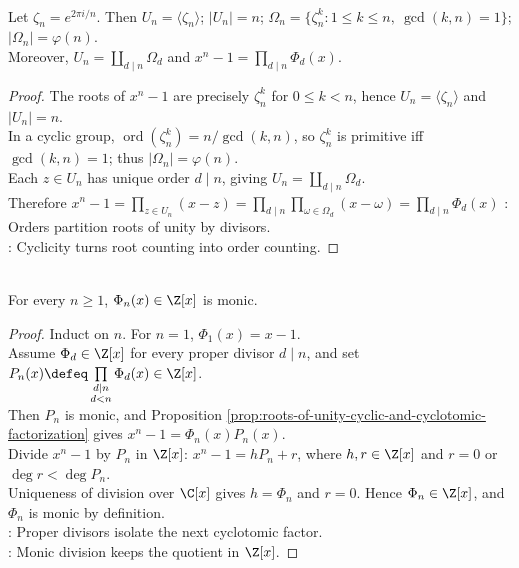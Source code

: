 \begin{proposition} \label{prop:roots-of-unity-cyclic-and-cyclotomic-factorization} \\
Let $\zeta_n=e^{2\pi i/n}$. Then $U_n=\langle\zeta_n\rangle$; $|U_n|=n$; $\Omega_n=\{\zeta_n^k:1\leq k\leq n,\ \gcd(k,n)=1\}$; $|\Omega_n|=\varphi(n)$.\\
Moreover, $U_n=\coprod\limits_{d\mid n}\Omega_d$ and $x^n-1=\prod\limits_{d\mid n}\Phi_d(x)$.
\begin{proof}
The roots of $x^n-1$ are precisely $\zeta_n^k$ for $0\leq k<n$, hence $U_n=\langle\zeta_n\rangle$ and $|U_n|=n$.\\
In a cyclic group, $\operatorname{ord}(\zeta_n^k)=n/\gcd(k,n)$, so $\zeta_n^k$ is primitive iff $\gcd(k,n)=1$; thus $|\Omega_n|=\varphi(n)$.\\
Each $z\in U_n$ has unique order $d\mid n$, giving $U_n=\coprod_{d\mid n}\Omega_d$.\\
Therefore $x^n-1=\prod\limits_{z\in U_n}(x-z)=\prod_{d\mid n}\prod\limits_{\omega\in\Omega_d}(x-\omega)=\prod\limits_{d\mid n}\Phi_d(x)$
: Orders partition roots of unity by divisors.\\
: Cyclicity turns root counting into order counting.
\end{proof}
\end{proposition}

\begin{proposition} \label{prop:cyclotomic-polynomials-integer-coefficients} \\
For every $n\geq1$, $\Phi_n(x)\in\Z[x]$ is monic.
\begin{proof}
Induct on $n$. For $n=1$, $\Phi_1(x)=x-1$.\\
Assume $\Phi_d\in\Z[x]$ for every proper divisor $d\mid n$, and set $P_n(x)\defeq\prod\limits_{\substack{d\mid n\\ d<n}}\Phi_d(x)\in\Z[x]$.\\
Then $P_n$ is monic, and Proposition \ref{prop:roots-of-unity-cyclic-and-cyclotomic-factorization} gives $x^n-1=\Phi_n(x)P_n(x)$.\\
Divide $x^n-1$ by $P_n$ in $\Z[x]$: $x^n-1=hP_n+r$, where $h,r\in\Z[x]$ and $r=0$ or $\deg r<\deg P_n$.\\
Uniqueness of division over $\C[x]$ gives $h=\Phi_n$ and $r=0$. Hence $\Phi_n\in\Z[x]$, and $\Phi_n$ is monic by definition.\\
: Proper divisors isolate the next cyclotomic factor.\\
: Monic division keeps the quotient in $\Z[x]$.
\end{proof}
\end{proposition}

